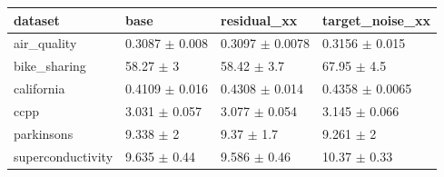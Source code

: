 \begin{tabular}{llll}
\toprule
dataset & base & residual\_xx & target\_noise\_xx \\
\midrule
air\_quality & 0.3087 $\pm$ 0.008 & 0.3097 $\pm$ 0.0078 & 0.3156 $\pm$ 0.015 \\
bike\_sharing & 58.27 $\pm$ 3 & 58.42 $\pm$ 3.7 & 67.95 $\pm$ 4.5 \\
california & 0.4109 $\pm$ 0.016 & 0.4308 $\pm$ 0.014 & 0.4358 $\pm$ 0.0065 \\
ccpp & 3.031 $\pm$ 0.057 & 3.077 $\pm$ 0.054 & 3.145 $\pm$ 0.066 \\
parkinsons & 9.338 $\pm$ 2 & 9.37 $\pm$ 1.7 & 9.261 $\pm$ 2 \\
superconductivity & 9.635 $\pm$ 0.44 & 9.586 $\pm$ 0.46 & 10.37 $\pm$ 0.33 \\
\bottomrule
\end{tabular}
